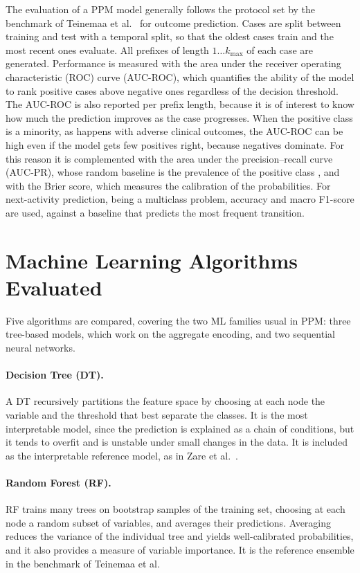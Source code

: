 The evaluation of a PPM model generally follows the protocol set by the benchmark of Teinemaa et al.\ \cite{teinemaa2019} for outcome prediction. Cases are split between training and test with a temporal split, so that the oldest cases train and the most recent ones evaluate. All prefixes of length $1 \ldots k_{\max}$ of each case are generated. Performance is measured with the area under the receiver operating characteristic (ROC) curve (AUC-ROC), which quantifies the ability of the model to rank positive cases above negative ones regardless of the decision threshold. The AUC-ROC is also reported per prefix length, because it is of interest to know how much the prediction improves as the case progresses. When the positive class is a minority, as happens with adverse clinical outcomes, the AUC-ROC can be high even if the model gets few positives right, because negatives dominate. For this reason it is complemented with the area under the precision--recall curve (AUC-PR), whose random baseline is the prevalence of the positive class \cite{saito2015}, and with the Brier score, which measures the calibration of the probabilities. For next-activity prediction, being a multiclass problem, accuracy and macro F1-score are used, against a baseline that predicts the most frequent transition.

\section{Machine Learning Algorithms Evaluated}

Five algorithms are compared, covering the two ML families usual in PPM: three tree-based models, which work on the aggregate encoding, and two sequential neural networks.

\paragraph{Decision Tree (DT).} A DT \cite{quinlan1986,breiman1984} recursively partitions the feature space by choosing at each node the variable and the threshold that best separate the classes. It is the most interpretable model, since the prediction is explained as a chain of conditions, but it tends to overfit and is unstable under small changes in the data. It is included as the interpretable reference model, as in Zare et al.\ \cite{zare2025}.

\paragraph{Random Forest (RF).} RF \cite{breiman2001} trains many trees on bootstrap samples of the training set, choosing at each node a random subset of variables, and averages their predictions. Averaging reduces the variance of the individual tree and yields well-calibrated probabilities, and it also provides a measure of variable importance. It is the reference ensemble in the benchmark of Teinemaa et al.

